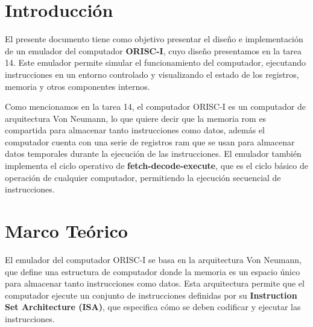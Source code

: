 \documentclass{article}
\begin{document}


\section{Introducción}\label{sec:intr}

El presente documento tiene como objetivo presentar el diseño e implementación de un emulador
del computador \textbf{ORISC-I}, cuyo diseño presentamos en la tarea 14. Este emulador permite simular el funcionamiento del computador, ejecutando instrucciones en un entorno controlado y visualizando el estado de los registros, memoria y otros componentes internos.

Como mencionamos en la tarea 14, el computador ORISC-I es un computador de arquitectura Von Neumann, lo que quiere decir que la memoria rom es compartida para almacenar tanto instrucciones como datos, además el computador cuenta con una serie de registros ram que se usan para almacenar datos temporales durante la ejecución de las instrucciones. El emulador también implementa el ciclo operativo de \textbf{fetch-decode-execute}, que es el ciclo básico de operación de cualquier computador, permitiendo la ejecución secuencial de instrucciones.


\section{Marco Teórico}\label{sec:marc}

El emulador del computador ORISC-I se basa en la arquitectura Von Neumann, que define una estructura de computador donde la memoria es un espacio único para almacenar tanto instrucciones como datos. Esta arquitectura permite que el computador ejecute un conjunto de instrucciones definidas por su \textbf{Instruction Set Architecture (ISA)}, que especifica cómo se deben codificar y ejecutar las instrucciones.
\end{document}
